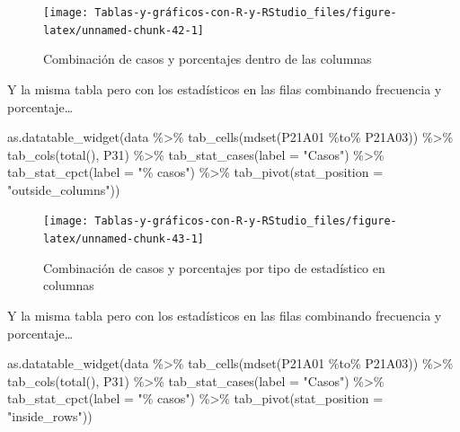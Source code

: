 \documentclass[
]{book}
\newenvironment{Shaded}{\begin{snugshade}}{\end{snugshade}}
\newcommand{\AttributeTok}[1]{\textcolor[rgb]{0.77,0.63,0.00}{#1}}
\newcommand{\FunctionTok}[1]{\textcolor[rgb]{0.00,0.00,0.00}{#1}}
\newcommand{\NormalTok}[1]{#1}
\newcommand{\SpecialCharTok}[1]{\textcolor[rgb]{0.00,0.00,0.00}{#1}}
\newcommand{\StringTok}[1]{\textcolor[rgb]{0.31,0.60,0.02}{#1}}
\begin{document}
\begin{figure}[H]

{\centering \texttt{[image: Tablas-y-gráficos-con-R-y-RStudio\_files/figure-latex/unnamed-chunk-42-1]} 

}

\caption{Combinación de casos y porcentajes dentro de las columnas}\label{fig:unnamed-chunk-42}
\end{figure}

Y la misma tabla pero con los estadísticos en las filas combinando frecuencia y porcentaje\ldots{}

\begin{Shaded}
\begin{Highlighting}[]
\FunctionTok{as.datatable\_widget}\NormalTok{(data }\SpecialCharTok{\%\textgreater{}\%} \FunctionTok{tab\_cells}\NormalTok{(}\FunctionTok{mdset}\NormalTok{(P21A01 }\SpecialCharTok{\%to\%} 
\NormalTok{  P21A03)) }\SpecialCharTok{\%\textgreater{}\%} \FunctionTok{tab\_cols}\NormalTok{(}\FunctionTok{total}\NormalTok{(), P31) }\SpecialCharTok{\%\textgreater{}\%} \FunctionTok{tab\_stat\_cases}\NormalTok{(}\AttributeTok{label =} \StringTok{"Casos"}\NormalTok{) }\SpecialCharTok{\%\textgreater{}\%} 
  \FunctionTok{tab\_stat\_cpct}\NormalTok{(}\AttributeTok{label =} \StringTok{"\% casos"}\NormalTok{) }\SpecialCharTok{\%\textgreater{}\%} \FunctionTok{tab\_pivot}\NormalTok{(}\AttributeTok{stat\_position =} \StringTok{"outside\_columns"}\NormalTok{))}
\end{Highlighting}
\end{Shaded}

\begin{figure}[H]

{\centering \texttt{[image: Tablas-y-gráficos-con-R-y-RStudio\_files/figure-latex/unnamed-chunk-43-1]} 

}

\caption{Combinación de casos y porcentajes por tipo de estadístico en columnas}\label{fig:unnamed-chunk-43}
\end{figure}

Y la misma tabla pero con los estadísticos en las filas combinando frecuencia y porcentaje\ldots{}

\begin{Shaded}
\begin{Highlighting}[]
\FunctionTok{as.datatable\_widget}\NormalTok{(data }\SpecialCharTok{\%\textgreater{}\%} \FunctionTok{tab\_cells}\NormalTok{(}\FunctionTok{mdset}\NormalTok{(P21A01 }\SpecialCharTok{\%to\%} 
\NormalTok{  P21A03)) }\SpecialCharTok{\%\textgreater{}\%} \FunctionTok{tab\_cols}\NormalTok{(}\FunctionTok{total}\NormalTok{(), P31) }\SpecialCharTok{\%\textgreater{}\%} \FunctionTok{tab\_stat\_cases}\NormalTok{(}\AttributeTok{label =} \StringTok{"Casos"}\NormalTok{) }\SpecialCharTok{\%\textgreater{}\%} 
  \FunctionTok{tab\_stat\_cpct}\NormalTok{(}\AttributeTok{label =} \StringTok{"\% casos"}\NormalTok{) }\SpecialCharTok{\%\textgreater{}\%} \FunctionTok{tab\_pivot}\NormalTok{(}\AttributeTok{stat\_position =} \StringTok{"inside\_rows"}\NormalTok{))}
\end{Highlighting}
\end{Shaded}
\end{document}
